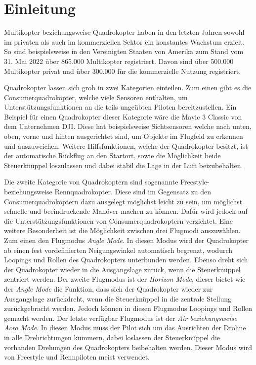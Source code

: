 
\chapter{Einleitung}

Multikopter beziehungsweise Quadrokopter haben in den letzten Jahren sowohl im privaten als auch im kommerziellen Sektor ein konstantes Wachstum erzielt. So sind beispielsweise in den Vereinigten Staaten von Amerika zum Stand vom 31. Mai 2022 über 865.000 Multikopter registriert. Davon sind über 500.000 Multikopter privat und über 300.000 für die kommerzielle Nutzung registriert. \cites{droneregistrationFAA}{dronestat1}{dronestat2}{dronestat3}

Quadrokopter lassen sich grob in zwei Kategorien einteilen. Zum einen gibt es die Consumerquadrokopter, welche viele  Sensoren enthalten, um Unterstützungsfunktionen an die teils ungeübten Piloten bereitzustellen. Ein Beispiel für einen Quadrokopter dieser Kategorie wäre die Mavic 3 Classic von dem Unternehmen DJI. Diese hat beispielsweise Sichtsensoren welche nach unten, oben, vorne und hinten ausgerichtet sind, um Objekte im Flugfeld zu erkennen und auszuweichen. Weitere Hilfsfunktionen, welche der Quadrokopter besitzt, ist der automatische Rückflug an den Startort, sowie die Möglichkeit beide Steuerknüppel loszulassen und dabei stabil die Lage in der Luft beizubehalten. \cite{djiMavicClassic}

Die zweite Kategorie von Quadrokoptern sind sogenannte Freestyle- beziehungsweise Rennquadrokopter. Diese sind im Gegensatz zu den Consumerquadrokoptern dazu ausgelegt möglichst leicht zu sein, um möglichst schnelle und beeindruckende Manöver machen zu können. Dafür wird jedoch auf die Unterstützungsfunktionen von Consumerquadrokoptern verzichtet. Eine weitere Besonderheit ist die Möglichkeit zwischen drei Flugmodi auszuwählen. Zum einen den Flugmodus \textit{Angle Mode}. In diesen Modus wird der Quadrokopter ab einen fest vordefinierten Neigungswinkel automatisch begrenzt, wodurch Loopings und Rollen des Quadrokopters unterbunden werden. Ebenso dreht sich der Quadrokopter wieder in die Ausgangslage zurück, wenn die Steuerknüppel zentriert werden. Der zweite Flugmodus ist der \textit{Horizon Mode}, dieser bietet wie der \textit{Angle Mode} die Funktion, dass sich der Quadrokopter wieder zur Ausgangslage zurückdreht, wenn die Steuerknüppel in die zentrale Stellung zurückgebracht werden. Jedoch können in diesen Flugmodus Loopings und Rollen gemacht werden. Der letzte verfügbar Flugmodus ist der \textit{Air beziehungsweise Acro Mode}. In diesen Modus muss der Pilot sich um das Ausrichten der Drohne in alle Drehrichtungen kümmern, dabei loslassen der Steuerknüppel die vorhanden Drehungen des Quadrokopters beibehalten werden. Dieser Modus wird von Freestyle und Rennpiloten meist verwendet. \cite{wedioFlugmodi}

